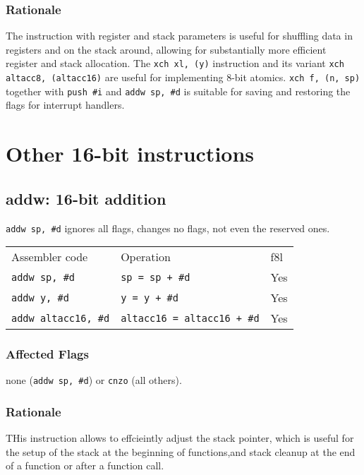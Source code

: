 \documentclass{book}
\begin{document}
\subsubsection*{Rationale}

The instruction with register and stack parameters is useful for shuffling data in registers and on the stack around, allowing for substantially more efficient register and stack allocation. The \texttt{xch xl, (y)} instruction and its variant \texttt{xch altacc8, (altacc16)} are useful for implementing 8-bit atomics. \texttt{xch f, (n, sp)} together with \texttt{push \#i} and \texttt{addw sp, \#d} is suitable for saving and restoring the flags for interrupt handlers.


\section{Other 16-bit instructions}

\subsection{addw: 16-bit addition}

\texttt{addw sp, \#d} ignores all flags, changes no flags, not even the reserved ones.

\begin{tabular}{l l l}
Assembler code              & Operation                          & f8l \\
\texttt{addw sp, \#d}       & \texttt{sp = sp + \#d}             & Yes \\
\texttt{addw y, \#d}        & \texttt{y = y + \#d}               & Yes \\
\texttt{addw altacc16, \#d} & \texttt{altacc16 = altacc16 + \#d} & Yes
\end{tabular}

\subsubsection*{Affected Flags}

none (\texttt{addw sp, \#d}) or \texttt{cnzo} (all others).

\subsubsection*{Rationale}

THis instruction allows to effcieintly adjust the stack pointer, which is useful for the setup of the stack at the beginning of functions,and stack cleanup at the end of a function or after a function call.
\end{document}
